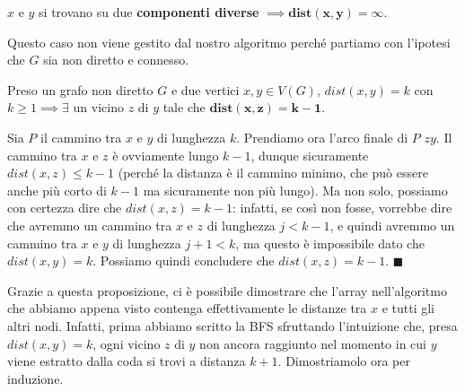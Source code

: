 \documentclass[11pt, a4paper, titlepage, oneside]{scrbook}
\begin{document}
\begin{Osservazione}[]
\label{oss-distanza}
$x$ e $y$ si trovano su due \textbf{componenti diverse} $\implies \bm{dist(x,y) = \infty}$.
\end{Osservazione}

Questo caso non viene gestito dal nostro algoritmo perché partiamo con l'ipotesi che $G$ sia non diretto e connesso.

\begin{Proposizione}[]
\label{propos-distanze}
Preso un grafo non diretto $G$ e due vertici $x,y \in V(G)$, $dist(x,y) = k$ con $k \geq 1 \implies \exists$ un vicino $z$ di $y$ tale che $\bm{dist(x,z) = k-1}$.
\end{Proposizione}

\Dimostrazione \nopagebreak

Sia $P$ il cammino tra $x$ e $y$ di lunghezza $k$. Prendiamo ora l'arco finale di $P$ $zy$. Il cammino tra $x$ e $z$ è ovviamente lungo $k-1$, dunque sicuramente $dist(x,z) \leq k-1$ (perché la distanza è il cammino minimo, che può essere anche più corto di $k-1$ ma sicuramente non più lungo). Ma non solo, possiamo con certezza dire che $dist(x,z) = k-1$: infatti, se così non fosse, vorrebbe dire che avremmo un cammino tra $x$ e $z$ di lunghezza $j < k-1$, e quindi avremmo un cammino tra $x$ e $y$ di lunghezza $j+1 < k$, ma questo è impossibile dato che $dist(x,y) = k$. Possiamo quindi concludere che $dist(x,z) = k-1$. $\blacksquare$

Grazie a questa proposizione, ci è possibile dimostrare che l'array  nell'algoritmo che abbiamo appena visto contenga effettivamente le distanze tra $x$ e tutti gli altri nodi. Infatti, prima abbiamo scritto la BFS sfruttando l'intuizione che, presa $dist(x,y) = k$, ogni vicino $z$ di $y$ non ancora raggiunto nel momento in cui $y$ viene estratto dalla coda si trovi a distanza $k + 1$. Dimostriamolo ora per induzione.
\end{document}
